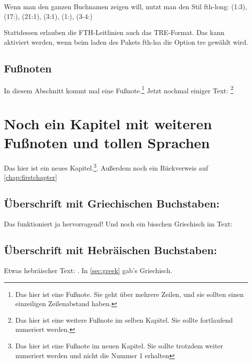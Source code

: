 \documentclass{scrreport}
\begin{document}
Wenn man den ganzen Buchnamen zeigen will, nutzt man den Stil fth-long: { (1:3), (17:), (21:1), (3:1), (1:), (3-4:)}

Stattdessen erlauben die FTH-Leitlinien auch das TRE-Format. Das kann aktiviert werden, wenn beim laden des Pakets fth-lsa die Option tre gewählt wird.

\fussy
\section{Fußnoten}
In diesem Abschnitt kommt mal eine Fußnote.\footnote{Das hier ist eine Fußnote. Sie geht über mehrere Zeilen, und sie sollten einen einzeiligen Zeilenabstand haben. \lipsum[1]} Jetzt nochmal einiger Text: \lipsum[1-9]\footnote{Das hier ist eine weitere Fußnote im selben Kapitel. Sie sollte fortlaufend numeriert werden.}

\chapter{Noch ein Kapitel mit weiteren Fußnoten und tollen Sprachen}
Das hier ist ein neues Kapitel.\footnote{Das hier ist eine Fußnote im neuen Kapitel. Sie sollte trotzdem weiter numeriert werden und nicht die Nummer 1 erhalten}. Außerdem noch ein Rückverweis auf \autoref{chap:firstchapter}

\section{Überschrift mit Griechischen Buchstaben: }
\label{sec:greek}
Das funktioniert ja hervorragend! Und noch ein bisschen Griechisch im Text: 

\section{Überschrift mit Hebräischen Buchstaben: }
Etwas hebräischer Text: . In \autoref{sec:greek} gab's Griechisch.

\end{document}
